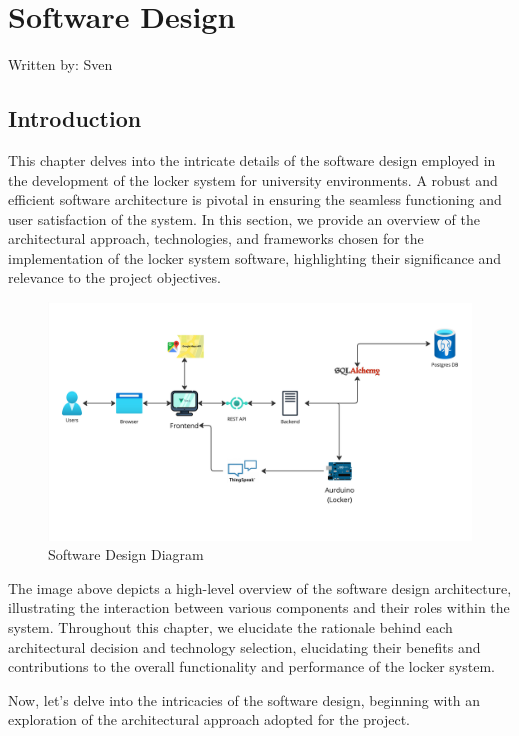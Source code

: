 \section{Software Design}
{\tiny Written by: Sven}

\subsection{Introduction}

This chapter delves into the intricate details of the software design employed in the
development of the locker system for university environments. A robust and efficient
software architecture is pivotal in ensuring the seamless functioning and user satisfaction
of the system. In this section, we provide an overview of the architectural approach,
technologies, and frameworks chosen for the implementation of the locker system software,
highlighting their significance and relevance to the project objectives.

\begin{figure}[h]
    \centering
    \includegraphics[width=\textwidth]{images/software_design_diagram}
    \caption{Software Design Diagram}
    \label{fig:software_design}
\end{figure}



The image above depicts a high-level overview of the software design architecture,
illustrating the interaction between various components and their roles within the system.
Throughout this chapter, we elucidate the rationale behind each architectural decision
and technology selection, elucidating their benefits and contributions to the overall
functionality and performance of the locker system.

Now, let's delve into the intricacies of the software design, beginning with an exploration
of the architectural approach adopted for the project.


